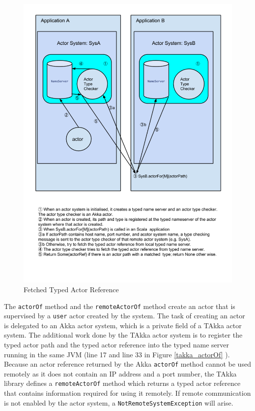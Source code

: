 \begin{figure}[p]
     \begin{center}            
\includegraphics[keepaspectratio=true,height=0.6\paperheight]
{Pictures/RemoteActorReference.png}
    \end{center}
     \caption{Fetched Typed Actor Reference}
   \label{takka_actorFor_fig}
\end{figure}

The {\tt actorOf} method and the {\tt remoteActorOf} method create an actor 
that is supervised by a {\tt user} actor created by the system.  The task of 
creating an actor is delegated to an Akka actor system, which is a private field 
of a TAkka actor system.  The additional work done by the TAkka actor system is 
to register the typed actor path and the typed actor reference into the typed 
name server running in the same JVM (line 17 and line 33 in Figure 
\ref{takka_actorOf} ).  Because an actor reference returned by the Akka  
{\tt actorOf} method cannot be used remotely as it does not contain an IP 
address and a port number, the TAkka library defines a {\tt remoteActorOf} 
method which returns a typed actor reference that contains information 
required for using it remotely.  If remote communication is not enabled by the 
actor system, a {\tt NotRemoteSystemException} will arise.


